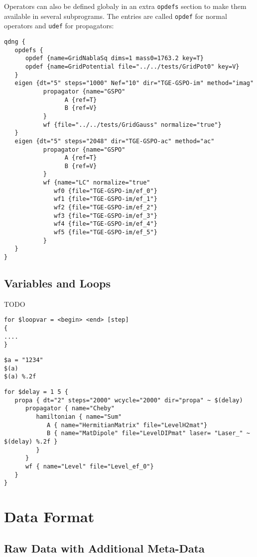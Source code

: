 \documentclass[a4paper,12pt]{scrbook}
\begin{document}
Operators can also be defined globaly in an extra \verb|opdefs| section to make them
available in several subprograms. The entries are called \verb|opdef| for normal operators
and \verb|udef| for propagators:
\begin{verbatim}
qdng {
   opdefs {
      opdef {name=GridNablaSq dims=1 mass0=1763.2 key=T}
      opdef {name=GridPotential file="../../tests/GridPot0" key=V}
   }
   eigen {dt="5" steps="1000" Nef="10" dir="TGE-GSPO-im" method="imag"
           propagator {name="GSPO"
                 A {ref=T}
                 B {ref=V}
           }
           wf {file="../../tests/GridGauss" normalize="true"}
   }
   eigen {dt="5" steps="2048" dir="TGE-GSPO-ac" method="ac"
           propagator {name="GSPO"
                 A {ref=T}
                 B {ref=V}
           }
           wf {name="LC" normalize="true"
              wf0 {file="TGE-GSPO-im/ef_0"}
              wf1 {file="TGE-GSPO-im/ef_1"}
              wf2 {file="TGE-GSPO-im/ef_2"}
              wf3 {file="TGE-GSPO-im/ef_3"}
              wf4 {file="TGE-GSPO-im/ef_4"}
              wf5 {file="TGE-GSPO-im/ef_5"}
           }
   }
}
\end{verbatim}

\section{Variables and Loops}
TODO
\begin{verbatim}
for $loopvar = <begin> <end> [step]
{
....
}
\end{verbatim}

\begin{verbatim}
$a = "1234"
$(a)
$(a) %.2f
\end{verbatim}

\begin{verbatim}
for $delay = 1 5 {
   propa { dt="2" steps="2000" wcycle="2000" dir="propa" ~ $(delay) 
      propagator { name="Cheby"
         hamiltonian { name="Sum"
            A { name="HermitianMatrix" file="LevelH2mat"}
            B { name="MatDipole" file="LevelDIPmat" laser= "Laser_" ~ $(delay) %.2f }
         }
      }
      wf { name="Level" file="Level_ef_0"}
   }
} 
\end{verbatim}


\chapter{Data Format}

\section{Raw Data with Additional Meta-Data}
\end{document}
